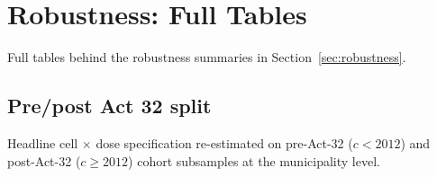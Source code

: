 \documentclass[12pt]{article}
\begin{document}
\section{Robustness: Full Tables}
\label{app:robustness}

Full tables behind the robustness summaries in
Section~\ref{sec:robustness}.

\subsection{Pre/post Act 32 split}
\label{app:rob-act32}

Headline cell $\times$ dose specification re-estimated on pre-Act-32
($c<2012$) and post-Act-32 ($c\geq 2012$) cohort subsamples at the
municipality level.



\end{document}
